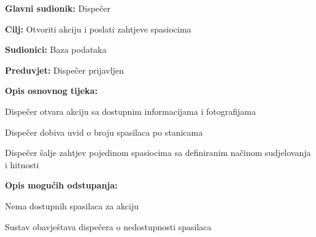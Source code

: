 					\noindent {}
					\begin{packed_item}
	
						\item \textbf{Glavni sudionik: }\text Dispečer
						\item  \textbf{Cilj:} \text Otvoriti akciju i poslati zahtjeve spasiocima
						\item  \textbf{Sudionici:} \text Baza podataka
						\item  \textbf{Preduvjet:} \text Dispečer prijavljen
						\item  \textbf{Opis osnovnog tijeka:}
						
						\item[] \begin{packed_enum}
	
							\item \text Dispečer otvara akciju sa dostupnim informacijama i fotografijama
							\item \text Dispečer dobiva uvid o broju spasilaca po stanicama
							\item \text Dispečer šalje zahtjev pojedinom spasiocima sa definiranim načinom sudjelovanja i hitnosti
						\end{packed_enum}
						
						\item  \textbf{Opis mogućih odstupanja:}
						
						\item[] \begin{packed_item}
	
							\item[2.a] \text Nema dostupnih spasilaca za akciju
							\item[] \begin{packed_item}
								
								\item \text Sustav obavještava dispečera o nedostupnosti spasilaca
								
							\end{packed_item}
							
						\end{packed_item}
					\end{packed_item}


